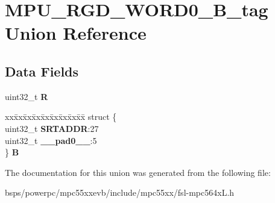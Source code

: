 \hypertarget{unionMPU__RGD__WORD0__32B__tag}{}\section{M\+P\+U\+\_\+\+R\+G\+D\+\_\+\+W\+O\+R\+D0\+\_\+B\+\_\+tag Union Reference}
\label{unionMPU__RGD__WORD0__32B__tag}
\subsection*{Data Fields}
\begin{DoxyCompactItemize}
\item 
\mbox{\label{unionMPU__RGD__WORD0__32B__tag_af51afda38d1ba4449311f6743b958b06}} 
uint32\+\_\+t {\bfseries R}
\item 
\mbox{\label{unionMPU__RGD__WORD0__32B__tag_a83f26005cdf4e9705ca0c823d83f9c98}} 
\begin{tabbing}
xx\=xx\=xx\=xx\=xx\=xx\=xx\=xx\=xx\=\kill
struct \{\\
\>uint32\_t {\bfseries SRTADDR}:27\\
\>uint32\_t {\bfseries \_\_pad0\_\_}:5\\
\} {\bfseries B}\\

\end{tabbing}\end{DoxyCompactItemize}


The documentation for this union was generated from the following file\+:\begin{DoxyCompactItemize}
\item 
bsps/powerpc/mpc55xxevb/include/mpc55xx/fsl-\/mpc564x\+L.\+h\end{DoxyCompactItemize}
